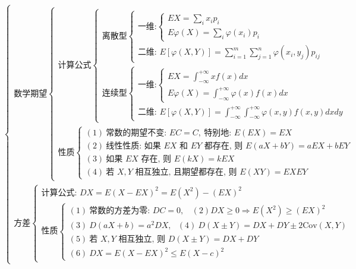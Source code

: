 ﻿\documentclass[lang=cn,11pt]{elegantbook}
\begin{document}
{\small
\[
\begin{cases}
\text{数学期望}
\begin{cases}
\text{计算公式}
\begin{cases}
\text{离散型}
\begin{cases}
\text{一维:}
\begin{cases}
EX = \sum\limits_{i} x_i p_i \\
E\varphi(X) = \sum\limits_{i} \varphi(x_i) p_i
\end{cases} \\
\text{二维: } E[\varphi(X,Y)] = \sum\limits_{i=1}^{m} \sum\limits_{j=1}^{n} \varphi(x_i,y_j) p_{ij}
\end{cases} \\
\text{连续型}
\begin{cases}
\text{一维:}
\begin{cases}
EX = \int_{-\infty}^{+\infty} x f(x) dx \\
E\varphi(X) = \int_{-\infty}^{+\infty} \varphi(x) f(x) dx
\end{cases} \\
\text{二维: } E[\varphi(X,Y)] = \int_{-\infty}^{+\infty} \int_{-\infty}^{+\infty} \varphi(x,y) f(x,y) dxdy
\end{cases}
\end{cases} \\
\text{性质}
\begin{cases}
(1)\ \text{常数的期望不变: } EC=C,\ \text{特别地: } E(EX)=EX \\
(2)\ \text{线性性质: 如果 } EX \text{ 和 } EY \text{ 都存在, 则 } E(aX+bY)=aEX+bEY \\
(3)\ \text{如果 } EX \text{ 存在, 则 } E(kX)=kEX \\
(4)\ \text{若 } X,Y \text{ 相互独立, 且期望都存在, 则 } E(XY)=EXEY
\end{cases}
\end{cases} \\
\text{方差}
\begin{cases}
\text{计算公式: } DX=E(X-EX)^2=E(X^2)-(EX)^2 \\
\text{性质}
\begin{cases}
(1)\ \text{常数的方差为零: } DC=0,~~~~ (2) DX\geqslant0 \Rightarrow E(X^2)\geqslant (EX)^2 \\
(3)\ D(aX+b)=a^2 DX,~~~ (4)\ D(X\pm Y)=DX+DY\pm 2\text{Cov}(X,Y) \\
(5)\ \text{若 } X,Y \text{ 相互独立, 则 } D(X\pm Y)=DX+DY \\
(6)\ DX=E(X-EX)^2\leqslant E(X-c)^2
\end{cases}

\end{cases}
\end{cases}\]}
\end{document}
